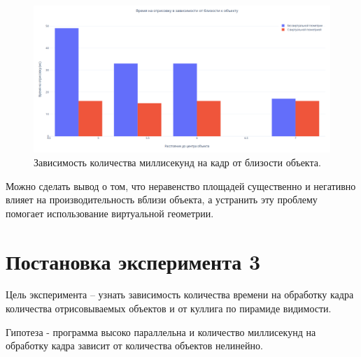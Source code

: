 \begin{figure}[H]
	\begin{center}
		\includegraphics[scale=0.4]{img/vgeom_graph.png}
	\end{center}
	\captionsetup{justification=centering}
	\caption{Зависимость количества миллисекунд на кадр от близости объекта.}
	\label{img:vgeom_graph}
\end{figure}

Можно сделать вывод о том, что неравенство площадей существенно и негативно влияет на производительность вблизи объекта, а устранить эту проблему помогает использование виртуальной геометрии.

\section{Постановка эксперимента 3} 

Цель эксперимента -- узнать зависимость количества времени на обработку кадра количества отрисовываемых объектов и от куллига по пирамиде видимости.

Гипотеза - программа высоко параллельна и количество миллисекунд на обработку кадра зависит от количества объектов нелинейно.

